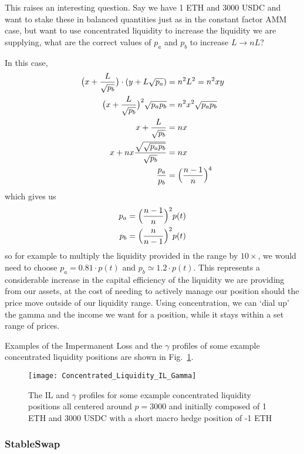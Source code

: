 \documentclass{article}
\begin{document}
This raises an interesting question. Say we have 1 ETH and 3000 USDC and want to stake these in balanced quantities just as in the constant factor AMM case, but want to use concentrated liquidity to increase the liquidity we are supplying, what are the correct values of $p_a$ and $p_b$ to increase $L \to nL$?

In this case,
\begin{align*}
\bigl( x + {\frac L {\sqrt{p_b}}} \bigr) \cdot ( y + L \sqrt{p_a} ) &= n^2 L^2 = n^2 xy \\
\bigl( x + {\frac L {\sqrt{p_b}}} \bigr)^2 \sqrt{p_a p_b} &= n^2 x^2 \sqrt{p_a p_b} \\
x + {\frac L {\sqrt{p_b}}} &= nx \\
x + nx {\frac {\sqrt{\sqrt{p_a p_b}}} {\sqrt{p_b}}} &= nx \\
{\frac {p_a} {p_b}} &= \Bigl({\frac {n-1} n}\Bigr)^4
\end{align*}
which gives us
\begin{align}
p_a &= \Bigl({\frac {n-1} n}\Bigr)^2 p(t) \\
p_b &= \Bigl({\frac n {n-1}}\Bigr)^2 p(t)
\label{eqn:multiply_liquidity}
\end{align}
so for example to multiply the liquidity provided in the range by $10 \times$, we would need to choose $p_a = 0.81 \cdot p(t)$ and $p_b \simeq 1.2 \cdot p(t)$. This represents a considerable increase in the capital efficiency of the liquidity we are providing from our assets, at the cost of needing to actively manage our position should the price move outside of our liquidity range. Using concentration, we can `dial up' the gamma and the income we want for a position, while it stays within a set range of prices.

Examples of the Impermanent Loss and the $\gamma$ profiles of some example concentrated liquidity positions are shown in Fig.~\ref{fig:concentrated_liquidity_il_gamma}.

\begin{figure}
\centering
\texttt{[image: Concentrated\_Liquidity\_IL\_Gamma]}
\caption{The IL and $\gamma$ profiles for some example concentrated liquidity positions all centered around $p=3000$ and initially composed of 1 ETH and 3000 USDC with a short macro hedge position of -1 ETH}
\label{fig:concentrated_liquidity_il_gamma}
\end{figure}


\subsubsection*{StableSwap}
\end{document}
